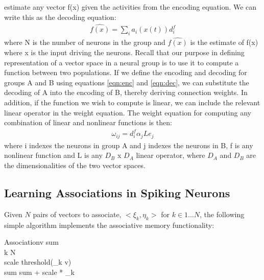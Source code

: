 \documentclass[10pt,letterpaper]{article}
\begin{document}
estimate any vector f(x) given the activities from the encoding equation. We can write
this as the decoding equation:
\begin{align}
\widehat{f(x)} = \sum_i a_i(x(t)) d^f_i \label{eqn:dec}
\end{align}
where N is the number of neurons in the group and $\widehat{f(x)}$ is the estimate of f(x) where x is the input driving the neurons. Recall that our purpose in defining representation of a vector space in a neural group
is to use it to compute a function between two populations. If we define the encoding
and decoding for groups A and B using equations \eqref{eqn:enc} and \eqref{eqn:dec}, we can substitute the
decoding of A into the encoding of B, thereby deriving connection weights. In addition, if the function we wish to compute is linear, we can include the relevant
linear operator in the weight equation. The weight equation for computing
any combination of linear and nonlinear functions is then:
\begin{align}
\omega_{ij} = d^f_i \alpha_j L e_j\label{eqn:weight}
\end{align}
where i indexes the neurons in group A and j indexes the neurons in B, f is any nonlinear function and L is any $D_B$ x $D_A$ linear operator, where $D_A$ and $D_B$ are the dimensionalities of the two vector spaces.


\subsection{Learning Associations in Spiking Neurons}
Given $N$ pairs of vectors to associate, $<\xi_k, \eta_k>$ for $k \in 1 \dots N$, the following simple algorithm implements the associative memory functionality:
 
\renewcommand{\thepseudocode}{1}

\begin{pseudocode}[ruled]{Association}{v}
  \label{alg:simple}
  sum \\
  \FOR k  \TO N\\
  \BEGIN
    scale \GETS threshold(\xi_k \cdot v) \\
    sum \GETS sum + scale * \eta_k\\
  \END\\
\end{pseudocode} 
\end{document}
